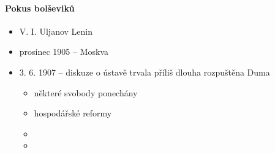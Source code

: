 \paragraph{Pokus bolševiků}
\begin{itemize}
\item V. I. Uljanov Lenin 
\item prosinec 1905 -- Moskva
\item 3. 6. 1907 -- diskuze o ústavě trvala příliš dlouha \ra rozpuštěna Duma
	\begin{itemize}
	\item některé svobody ponechány
	\item hospodářské reformy
	\item
	\item 
	\end{itemize}
\end{itemize}



\newpage
\timeline

